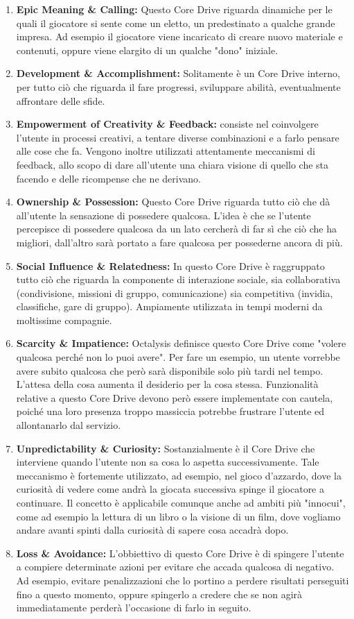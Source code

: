 \begin{enumerate}
    \item \textbf{Epic Meaning \& Calling:} Questo Core Drive riguarda dinamiche per le quali il giocatore si sente come un eletto, un predestinato a qualche grande impresa. Ad esempio il giocatore viene incaricato di creare nuovo materiale e contenuti, oppure viene elargito di un qualche "dono" iniziale.
    \item \textbf{Development \& Accomplishment:} Solitamente è un Core Drive interno, per tutto ciò che riguarda il fare progressi, sviluppare abilità, eventualmente affrontare delle sfide.
    \item \textbf{Empowerment of Creativity \& Feedback:} consiste nel coinvolgere l'utente in processi creativi, a tentare diverse combinazioni e a farlo pensare alle cose che fa. Vengono inoltre utilizzati attentamente meccanismi di feedback, allo scopo di dare all'utente una chiara visione di quello che sta facendo e delle ricompense che ne derivano.
    \item \textbf{Ownership \& Possession:} Questo Core Drive riguarda tutto ciò che dà all'utente la sensazione di possedere qualcosa. L'idea è che se l'utente percepisce di possedere qualcosa da un lato cercherà di far sì che ciò che ha migliori, dall'altro sarà portato a fare qualcosa per possederne ancora di più.
    \item \textbf{Social Influence \& Relatedness:} In questo Core Drive è raggruppato tutto ciò che riguarda la componente di interazione sociale, sia collaborativa (condivisione, missioni di gruppo, comunicazione) sia competitiva (invidia, classifiche, gare di gruppo). Ampiamente utilizzata in tempi moderni da moltissime compagnie.
    \item \textbf{Scarcity \& Impatience:} Octalysis definisce questo Core Drive come "volere qualcosa perché non lo puoi avere". Per fare un esempio, un utente vorrebbe avere subito qualcosa che però sarà disponibile solo più tardi nel tempo. L'attesa della cosa aumenta il desiderio per la cosa stessa. Funzionalità relative a questo Core Drive devono però essere implementate con cautela, poiché una loro presenza troppo massiccia potrebbe frustrare l'utente ed allontanarlo dal servizio.
    \item \textbf{Unpredictability \& Curiosity:} Sostanzialmente è il Core Drive che interviene quando l'utente non sa cosa lo aspetta successivamente. Tale meccanismo è fortemente utilizzato, ad esempio, nel gioco d'azzardo, dove la curiosità di vedere come andrà la giocata successiva spinge il giocatore a continuare. Il concetto è applicabile comunque anche ad ambiti più "innocui", come ad esempio la lettura di un libro o la visione di un film, dove vogliamo andare avanti spinti dalla curiosità di sapere cosa accadrà dopo.
    \item \textbf{Loss \& Avoidance:} L'obbiettivo di questo Core Drive è di spingere l'utente a compiere determinate azioni per evitare che accada qualcosa di negativo. Ad esempio, evitare penalizzazioni che lo portino a perdere risultati perseguiti fino a questo momento, oppure spingerlo a credere che se non agirà immediatamente perderà l'occasione di farlo in seguito.
\end{enumerate}

